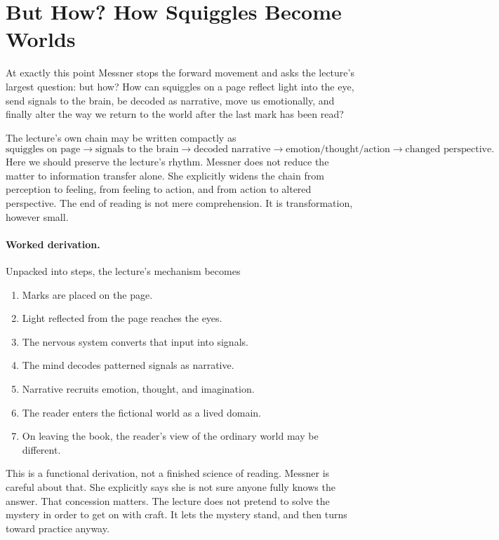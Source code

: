 \section{But How? How Squiggles Become Worlds}

At exactly this point Messner stops the forward movement and asks the lecture's largest question: but how? How can squiggles on a page reflect light into the eye, send signals to the brain, be decoded as narrative, move us emotionally, and finally alter the way we return to the world after the last mark has been read?

The lecture's own chain may be written compactly as
\begin{equation}
\text{squiggles on page} \to \text{signals to the brain} \to \text{decoded narrative} \to \text{emotion/thought/action} \to \text{changed perspective}.
\end{equation}
Here we should preserve the lecture's rhythm. Messner does not reduce the matter to information transfer alone. She explicitly widens the chain from perception to feeling, from feeling to action, and from action to altered perspective. The end of reading is not mere comprehension. It is transformation, however small.

\paragraph{Worked derivation.} Unpacked into steps, the lecture's mechanism becomes
\begin{enumerate}
\item Marks are placed on the page.
\item Light reflected from the page reaches the eyes.
\item The nervous system converts that input into signals.
\item The mind decodes patterned signals as narrative.
\item Narrative recruits emotion, thought, and imagination.
\item The reader enters the fictional world as a lived domain.
\item On leaving the book, the reader's view of the ordinary world may be different.
\end{enumerate}

This is a functional derivation, not a finished science of reading. Messner is careful about that. She explicitly says she is not sure anyone fully knows the answer. That concession matters. The lecture does not pretend to solve the mystery in order to get on with craft. It lets the mystery stand, and then turns toward practice anyway.

